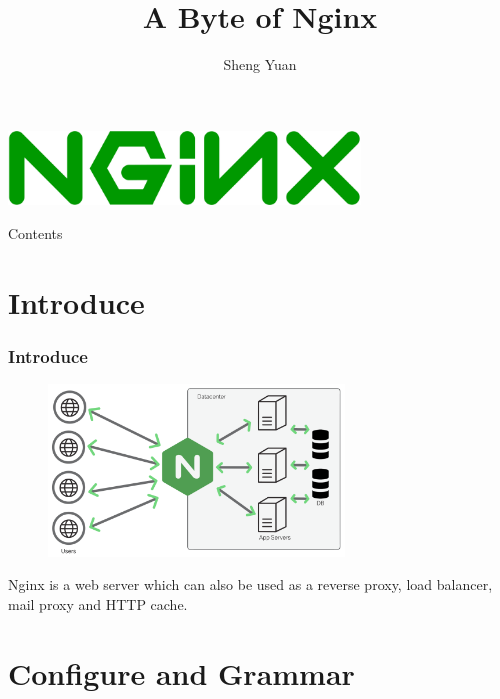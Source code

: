 \documentclass{beamer}
\title{A Byte of Nginx}
\author{Sheng Yuan}
\begin{document}
    
\begin{frame}
	\centering\includegraphics[width=0.7\textwidth]{nginx.png}
    \titlepage
\end{frame}

\begin{frame}{Contents}
    \tableofcontents
\end{frame}

\section{Introduce}
\begin{frame}
\frametitle{Introduce}
	\begin{figure}
		\centering\includegraphics[width=0.7\textwidth]{nginx_architecture.png}
	\end{figure}


Nginx is a web server which can also be used as a reverse proxy, load balancer, mail proxy and HTTP cache.
\end{frame}


\section{Configure and Grammar}
\end{document}

